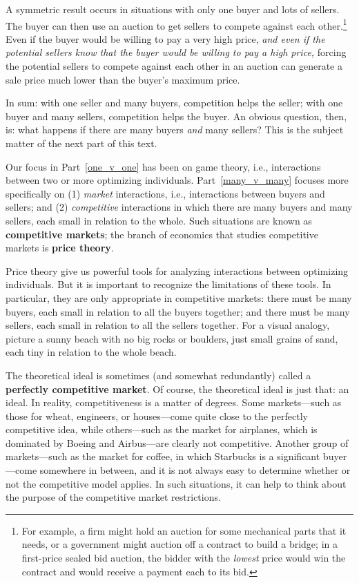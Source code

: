 A symmetric result occurs in situations with only one buyer and lots of sellers. The buyer can then use an auction to get sellers to compete against each other.\footnote{For example, a firm might hold an auction for some mechanical parts that it needs, or a government might auction off a contract to build a bridge; in a first-price sealed bid auction, the bidder with the \emph{lowest} price would win the contract and would receive a payment each to its bid.} Even if the buyer would be willing to pay a very high price, \emph{and even if the potential sellers know that the buyer would be willing to pay a high price,} forcing the potential sellers to compete against each other in an auction can generate a sale price much lower than the buyer's maximum price.

In sum: with one seller and many buyers, competition helps the seller; with one buyer and many sellers, competition helps the buyer. An obvious question, then, is: what happens if there are many buyers \emph{and} many sellers? This is the subject matter of the next part of this text.

Our focus in Part~\ref{one_v_one} has been on game theory, i.e., interactions between two or more optimizing individuals. Part~\ref{many_v_many} focuses more specifically on (1) \emph{market} interactions, i.e., interactions between buyers and sellers; and (2) \emph{competitive} interactions in which there are many buyers and many sellers, each small in relation to the whole. Such situations are known as \textbf{competitive markets}; the branch of economics that studies competitive markets is \textbf{price theory}.

Price theory give us powerful tools for analyzing interactions between optimizing individuals. But it is important to recognize the limitations of these tools. In particular, they are only appropriate in competitive markets: there must be many buyers, each small in relation to all the buyers together; and there must be many sellers, each small in relation to all the sellers together. For a visual analogy, picture a sunny beach with no big rocks or boulders, just small grains of sand, each tiny in relation to the whole beach.

The theoretical ideal is sometimes (and somewhat redundantly) called a \textbf{perfectly competitive market}. Of course, the theoretical ideal is just that: an ideal. In reality, competitiveness is a matter of degrees. Some markets---such as those for wheat, engineers, or houses---come quite close to the perfectly competitive idea, while others---such as the market for airplanes, which is dominated by Boeing and Airbus---are clearly not competitive. Another group of markets---such as the market for coffee, in which Starbucks is a significant buyer---come somewhere in between, and it is not always easy to determine whether or not the competitive model applies. In such situations, it can help to think about the purpose of the competitive market restrictions.

